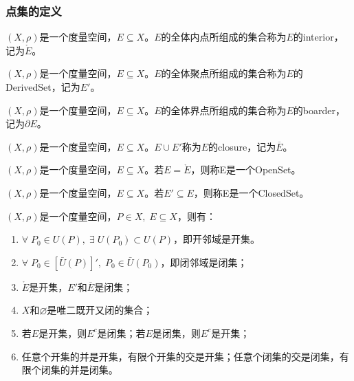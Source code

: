 \subsubsection{点集的定义}
\begin{definition}
	$(X,\rho)$是一个度量空间，$E\subseteq X$。$E$的全体内点所组成的集合称为$E$的\gls{interior}，记为$\mathring{E}$。
\end{definition}
\begin{definition}
	$(X,\rho)$是一个度量空间，$E\subseteq X$。$E$的全体聚点所组成的集合称为$E$的\gls{DerivedSet}，记为$E'$。
\end{definition}
\begin{definition}
	$(X,\rho)$是一个度量空间，$E\subseteq X$。$E$的全体界点所组成的集合称为$E$的\gls{boarder}，记为$\partial E$。
\end{definition}
\begin{definition}
	$(X,\rho)$是一个度量空间，$E\subseteq X$。$E\cup E'$称为$E$的\gls{closure}，记为$\overline{E}$。
\end{definition}
\begin{definition}
	$(X,\rho)$是一个度量空间，$E\subseteq X$。若$E=\mathring{E}$，则称E是一个\gls{OpenSet}。
\end{definition}
\begin{definition}
	$(X,\rho)$是一个度量空间，$E\subseteq X$。若$E'\subseteq E$，则称E是一个\gls{ClosedSet}。
\end{definition}
\begin{property}\label{prop:OpenClosedSet}
	$(X,\rho)$是一个度量空间，$P\in X,\;E\subseteq X$，则有：
	\begin{enumerate}
		\item $\forall\;P_0\in U(P),\;\exists\;U(P_0)\subset U(P)$，即开邻域是开集。
		\item $\forall\;P_0\in[\bar{U}(P)]',\;P_0\in \bar{U}(P_0)$，即闭邻域是闭集；
		\item $\mathring{E}$是开集，$E'$和$\overline{E}$是闭集；
		\item $X$和$\varnothing$是唯二既开又闭的集合；
		\item 若$E$是开集，则$E^c$是闭集；若$E$是闭集，则$E^c$是开集；
		\item 任意个开集的并是开集，有限个开集的交是开集；任意个闭集的交是闭集，有限个闭集的并是闭集。
	\end{enumerate}
\end{property}
